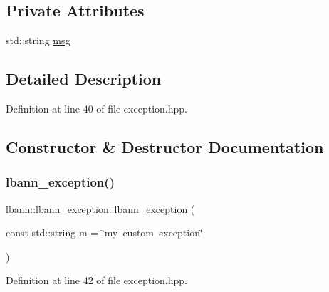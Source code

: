 \subsection*{Private Attributes}
\begin{DoxyCompactItemize}
\item 
std\+::string \hyperlink{classlbann_1_1lbann__exception_a8698ff209b53c8452b5ca1d0caf7b824}{msg}
\end{DoxyCompactItemize}


\subsection{Detailed Description}


Definition at line 40 of file exception.\+hpp.



\subsection{Constructor \& Destructor Documentation}
\mbox{\label{classlbann_1_1lbann__exception_adbbe5260b3e3bd951ed2cb9363040f4a}} 
\subsubsection{\texorpdfstring{lbann\+\_\+exception()}{lbann\_exception()}}
{\footnotesize\ttfamily lbann\+::lbann\+\_\+exception\+::lbann\+\_\+exception (\begin{DoxyParamCaption}\item[{const std\+::string}]{m = {\ttfamily \char`\"{}my~custom~exception\char`\"{}} }\end{DoxyParamCaption})\hspace{0.3cm}{\ttfamily [inline]}}



Definition at line 42 of file exception.\+hpp.


